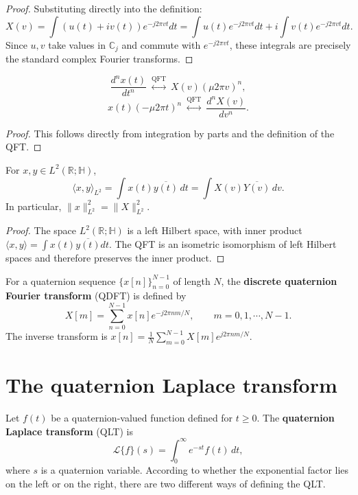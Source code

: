 \begin{proof}
Substituting directly into the definition:
\[
X(v)=\int(u(t)+iv(t))e^{-j2\pi vt}dt=\int u(t)e^{-j2\pi vt}dt+i\int v(t)e^{-j2\pi vt}dt.
\]
Since $u,v$ take values in $\mathbb{C}_j$ and commute with $e^{-j2\pi vt}$, these integrals are precisely the standard complex Fourier transforms.
\end{proof}

\begin{theorem}\label{thm:q_fourier_derivative}
\[
\frac{d^n x(t)}{dt^n}\ \overset{\text{QFT}}{\longleftrightarrow}\ X(v)(\mu 2\pi v)^n,
\]
\[
x(t)(-\mu 2\pi t)^n\ \overset{\text{QFT}}{\longleftrightarrow}\ \frac{d^n X(v)}{dv^n}.
\]
\end{theorem}

\begin{proof}
This follows directly from integration by parts and the definition of the QFT.
\end{proof}

\begin{theorem}\label{thm:q_parseval}
For $x,y\in L^2(\mathbb{R};\mathbb{H})$,
\[
\langle x,y\rangle_{L^2}=\int x(t)\overline{y(t)}\,dt=\int X(v)\overline{Y(v)}\,dv.
\]
In particular, $\|x\|_{L^2}^2=\|X\|_{L^2}^2$.
\end{theorem}

\begin{proof}
The space $L^2(\mathbb{R};\mathbb{H})$ is a left Hilbert space, with inner product $\langle x,y\rangle=\int x(t)\overline{y(t)}dt$. The QFT is an isometric isomorphism of left Hilbert spaces and therefore preserves the inner product.
\end{proof}

\begin{definition}\label{def:q_dft}
For a quaternion sequence $\{x[n]\}_{n=0}^{N-1}$ of length $N$, the \textbf{discrete quaternion Fourier transform} (QDFT) is defined by
\[
X[m]=\sum_{n=0}^{N-1}x[n]e^{-j2\pi nm/N},\qquad m=0,1,\cdots,N-1.
\]
The inverse transform is $x[n]=\frac1N\sum_{m=0}^{N-1}X[m]e^{j2\pi nm/N}$.
\end{definition}

\section{The quaternion Laplace transform}

\begin{definition}\label{def:q_laplace}
Let $f(t)$ be a quaternion-valued function defined for $t\ge 0$. The \textbf{quaternion Laplace transform} (QLT) is
\[
\mathcal{L}\{f\}(s)=\int_0^\infty e^{-st}f(t)\,dt,
\]
where $s$ is a quaternion variable. According to whether the exponential factor lies on the left or on the right, there are two different ways of defining the QLT.
\end{definition}

